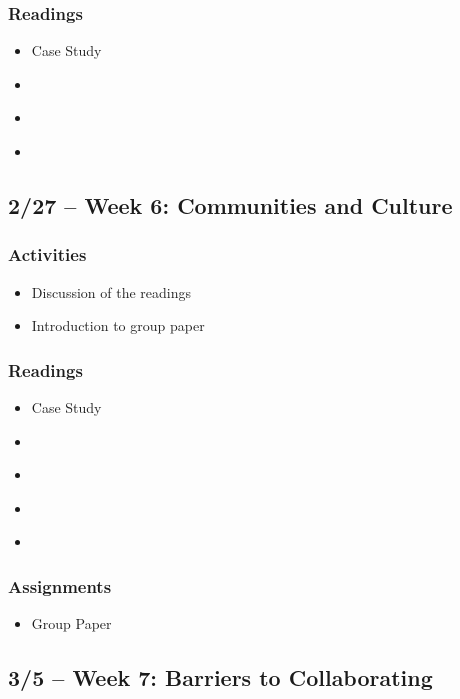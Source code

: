 \documentclass[12pt, letterpaper]{article}
\begin{document}
    \subsubsection*{Readings}
        \begin{itemize}
            \item Case Study
            \item \citet[chapters 3, 6]{Agranoff2012}
            \item \citet[chapter 8]{Agranoff2017}
            \item \citet[chapter 3]{Kickert1997}
        \end{itemize}


\subsection*{2/27 -- Week 6: Communities and Culture}
    \subsubsection*{Activities}
        \begin{itemize}
            \item Discussion of the readings
            \item Introduction to group paper
        \end{itemize}
    \subsubsection*{Readings}
        \begin{itemize}
            \item Case Study
            \item \citet[chapter 6]{Agranoff2023}
            \item \citet[chapter 3]{Henderson2015}
            \item \citet{Lubell2007}
            \item \citet[chapter 4]{Wondolleck2000}
        \end{itemize}   
    \subsubsection*{Assignments}
        \begin{itemize}
            \item Group Paper
        \end{itemize}     

\subsection*{3/5 -- Week 7: Barriers to Collaborating}
\end{document}
